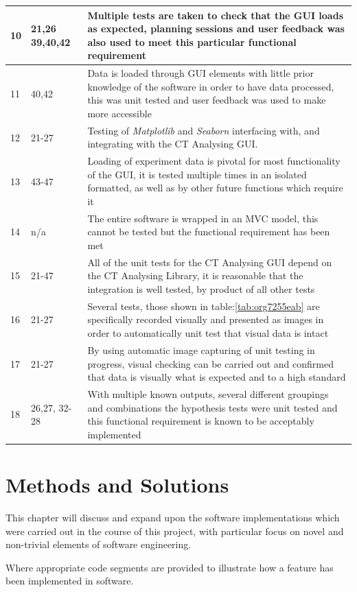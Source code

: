 \documentclass[11pt]{report}
\begin{document}
\begin{longtable}{|l|l|p{14cm}|}
\hline
10 & 21,26 39,40,42 & Multiple tests are taken to check that the GUI loads as expected, planning sessions and user feedback was also used to meet this particular functional requirement\\
\hline
11 & 40,42 & Data is loaded through GUI elements with little prior knowledge of the software in order to have data processed, this was unit tested and user feedback was used to make more accessible\\
\hline
12 & 21-27 & Testing of \emph{Matplotlib} and \emph{Seaborn} interfacing with, and integrating with the CT Analysing GUI.\\
\hline
13 & 43-47 & Loading of experiment data is pivotal for most functionality of the GUI, it is tested multiple times in an isolated formatted, as well as by other future functions which require it\\
\hline
14 & n/a & The entire software is wrapped in an MVC model, this cannot be tested but the functional requirement has been met\\
\hline
15 & 21-47 & All of the unit tests for the CT Analysing GUI depend on the CT Analysing Library, it is reasonable that the integration is well tested, by product of all other tests\\
\hline
16 & 21-27 & Several tests, those shown in table:\ref{tab:org7255eab} are specifically recorded visually and presented as images in order to automatically unit test that visual data is intact\\
\hline
17 & 21-27 & By using automatic image capturing of unit testing in progress, visual checking can be carried out and confirmed that data is visually what is expected and to a high standard\\
\hline
18 & 26,27, 32-28 & With multiple known outputs, several different groupings and combinations the hypothesis tests were unit tested and this functional requirement is known to be acceptably implemented\\
\hline
\end{longtable}

\chapter{Methods and Solutions}
\label{sec:org90bfcde}
This chapter will discuss and expand upon the software implementations which were carried out in the course of this project, with particular focus on novel and non-trivial elements of software engineering.

Where appropriate code segments are provided to illustrate how a feature has been implemented in software.
\end{document}
